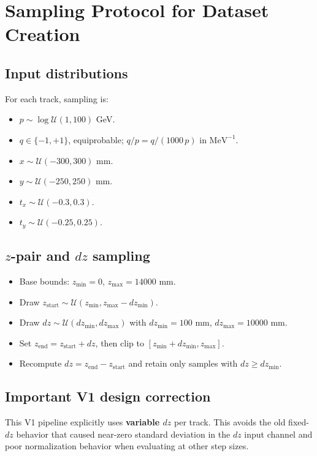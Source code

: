 \documentclass[11pt,a4paper]{article}
\begin{document}
\section{Sampling Protocol for Dataset Creation}
\subsection{Input distributions}
For each track, sampling is:
\begin{itemize}[leftmargin=*]
  \item $p\sim\log\mathcal{U}(1,100)$ GeV.
  \item $q\in\{-1,+1\}$, equiprobable; $q/p = q/(1000\,p)$ in $\mathrm{MeV}^{-1}$.
  \item $x\sim\mathcal{U}(-300,300)$ mm.
  \item $y\sim\mathcal{U}(-250,250)$ mm.
  \item $t_x\sim\mathcal{U}(-0.3,0.3)$.
  \item $t_y\sim\mathcal{U}(-0.25,0.25)$.
\end{itemize}

\subsection{$z$-pair and $dz$ sampling}
\begin{itemize}[leftmargin=*]
  \item Base bounds: $z_{\min}=0$, $z_{\max}=14000$ mm.
  \item Draw $z_{\mathrm{start}}\sim\mathcal{U}(z_{\min}, z_{\max}-dz_{\min})$.
  \item Draw $dz\sim\mathcal{U}(dz_{\min},dz_{\max})$ with $dz_{\min}=100$ mm, $dz_{\max}=10000$ mm.
  \item Set $z_{\mathrm{end}}=z_{\mathrm{start}}+dz$, then clip to $[z_{\min}+dz_{\min}, z_{\max}]$.
  \item Recompute $dz=z_{\mathrm{end}}-z_{\mathrm{start}}$ and retain only samples with $dz\ge dz_{\min}$.
\end{itemize}

\subsection{Important V1 design correction}
This V1 pipeline explicitly uses \textbf{variable $dz$} per track. This avoids the old fixed-$dz$ behavior that caused near-zero standard deviation in the $dz$ input channel and poor normalization behavior when evaluating at other step sizes.
\end{document}
